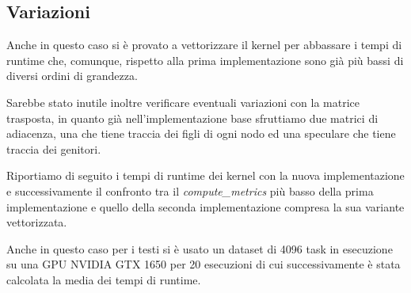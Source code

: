 \documentclass[../relazione.tex]{subfiles}
\begin{document}
\subsection{Variazioni}
Anche in questo caso si è provato a vettorizzare il kernel per abbassare i tempi di runtime che, comunque, rispetto alla prima implementazione sono già più bassi di diversi ordini di grandezza.

Sarebbe stato inutile inoltre verificare eventuali variazioni con la matrice trasposta, in quanto già nell'implementazione base sfruttiamo due matrici di adiacenza, una che tiene traccia dei figli di ogni nodo ed una speculare che tiene traccia dei genitori.

Riportiamo di seguito i tempi di runtime dei kernel con la nuova implementazione e successivamente il confronto tra il \textit{compute\_metrics} più basso della prima implementazione e quello della seconda implementazione compresa la sua variante vettorizzata.

Anche in questo caso per i testi si è usato un dataset di 4096 task in esecuzione su una GPU NVIDIA GTX 1650 per 20 esecuzioni di cui successivamente è stata calcolata la media dei tempi di runtime.
\end{document}
